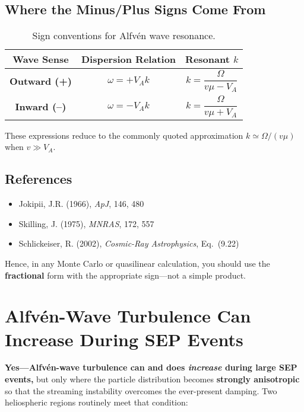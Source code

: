 \subsection*{Where the Minus/Plus Signs Come From}

\begin{table}[H]
\centering
\renewcommand{\arraystretch}{1.3}
\begin{tabular}{|c|c|c|}
\hline
\textbf{Wave Sense} & \textbf{Dispersion Relation} & \textbf{Resonant $k$} \\
\hline
\textbf{Outward (+)} & $\omega = +V_A k$ & $k = \dfrac{\Omega}{v\mu - V_A}$ \\
\textbf{Inward (–)}  & $\omega = -V_A k$ & $k = \dfrac{\Omega}{v\mu + V_A}$ \\
\hline
\end{tabular}
\caption{Sign conventions for Alfvén wave resonance.}
\end{table}

These expressions reduce to the commonly quoted approximation $k \simeq \Omega / (v\mu)$ when $v \gg V_A$.

\subsection*{References}

\begin{itemize}
    \item Jokipii, J.R. (1966), \textit{ApJ}, 146, 480
    \item Skilling, J. (1975), \textit{MNRAS}, 172, 557
    \item Schlickeiser, R. (2002), \textit{Cosmic-Ray Astrophysics}, Eq.~(9.22)
\end{itemize}

\medskip

\noindent Hence, in any Monte Carlo or quasilinear calculation, you should use the \textbf{fractional} form with the appropriate sign—not a simple product.


\section*{Alfvén-Wave Turbulence Can Increase During SEP Events}

\textbf{Yes—Alfvén-wave turbulence can and does \textit{increase} during large SEP events,} but only where the particle distribution becomes \textbf{strongly anisotropic} so that the streaming instability overcomes the ever-present damping. Two heliospheric regions routinely meet that condition:

